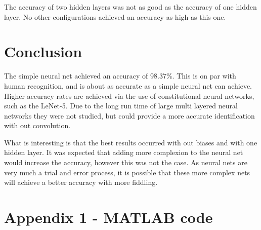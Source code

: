 \documentclass[12pt]{article}
\begin{document}
	The accuracy of two hidden layers was not as good as the accuracy of one hidden layer. No other configurations achieved an accuracy as high as this one. 

	
	\section{Conclusion}
	
	The simple neural net achieved an accuracy of 98.37\%. This is on par with human recognition, and is about as accurate as a simple neural net can achieve. Higher accuracy rates are achieved via the use of constitutional neural networks, such as the  LeNet-5\cite{len5}. Due to the long run time of large multi layered neural networks they were not studied, but could provide a more accurate identification with out convolution.\par 
	
	What is interesting is that the best results occurred with out biases and with one hidden layer. It was expected that adding more complexion to the neural net would increase the accuracy, however this was not the case. As neural nets are very much a trial and error process, it is possible that these more complex nets will achieve a better accuracy with more fiddling.\par 


		
		
		

		
		\singlespacing
		\section*{Appendix 1 - MATLAB code}
		
\end{document}
